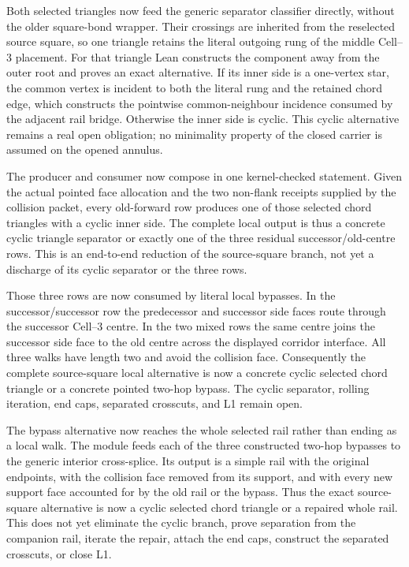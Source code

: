 \documentclass[11pt]{article}
\theoremstyle{definition}
\begin{document}
Both selected triangles now feed the generic separator classifier directly,
without the older square-bond wrapper.  Their crossings are inherited from the
reselected source square, so one triangle retains the literal outgoing rung of
the middle Cell--3 placement.  For that triangle Lean constructs the component
away from the outer root and proves an exact alternative.  If its inner side is
a one-vertex star, the common vertex is incident to both the literal rung and
the retained chord edge, which constructs the pointwise common-neighbour
incidence consumed by the adjacent rail bridge.  Otherwise the inner side is
cyclic.  This cyclic alternative remains a real open obligation; no minimality
property of the closed carrier is assumed on the opened annulus.

The producer and consumer now compose in one kernel-checked statement.  Given
the actual pointed face allocation and the two non-flank receipts supplied by
the collision packet, every old-forward row produces one of those selected
chord triangles with a cyclic inner side.  The complete local output is thus a
concrete cyclic triangle separator or exactly one of the three residual
successor/old-centre rows.  This is an end-to-end reduction of the source-square
branch, not yet a discharge of its cyclic separator or the three rows.

Those three rows are now consumed by literal local bypasses.  In the
successor/successor row the predecessor and successor side faces route through
the successor Cell--3 centre.  In the two mixed rows the same centre joins the
successor side face to the old centre across the displayed corridor interface.
All three walks have length two and avoid the collision face.  Consequently
the complete source-square local alternative is now a concrete cyclic selected
chord triangle or a concrete pointed two-hop bypass.  The cyclic separator,
rolling iteration, end caps, separated crosscuts, and L1 remain open.

The bypass alternative now reaches the whole selected rail rather than ending
as a local walk.  The module
feeds each of the three constructed two-hop bypasses to the generic interior
cross-splice.  Its output is a simple rail with the original endpoints, with
the collision face removed from its support, and with every new support face
accounted for by the old rail or the bypass.  Thus the exact source-square
alternative is now a cyclic selected chord triangle or a repaired whole rail.
This does not yet eliminate the cyclic branch, prove separation from the
companion rail, iterate the repair, attach the end caps, construct the separated
crosscuts, or close L1.
\end{document}
